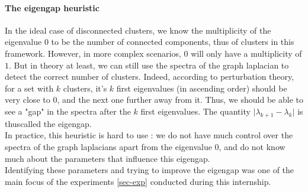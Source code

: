 \documentclass[a4paper,12pt]{article}
\theoremstyle{definition}
\theoremstyle{plain}
\begin{document}
\paragraph{The eigengap heuristic}
In the ideal case of disconnected clusters, we know the multiplicity of the eigenvalue $0$ to be the number of connected components, thus of clusters in this framework. However, in more complex scenarios, $0$ will only have a multiplicity of $1$. But in theory at least, we can still use the spectra of the graph laplacian to detect the correct number of clusters. Indeed, according to perturbation theory, for a set with $k$ clusters, it's $k$ first eigenvalues (in ascending order) should be very close to $0$, and the next one further away from it. Thus, we should be able to see a "gap" in the spectra after the $k$ first eigenvalues. The quantity $\lvert \lambda_{k+1} - \lambda_k \rvert$ is thuscalled the eigengap. \\
In practice, this heuristic is hard to use : we do not have much control over the spectra of the graph laplacians apart from the eigenvalue $0$, and do not know much about the parameters that influence this eigengap.\\ Identifying these parameters and trying to improve the eigengap was one of the main focus of the experiments \ref{sec-exp} conducted during this internship.
\end{document}
